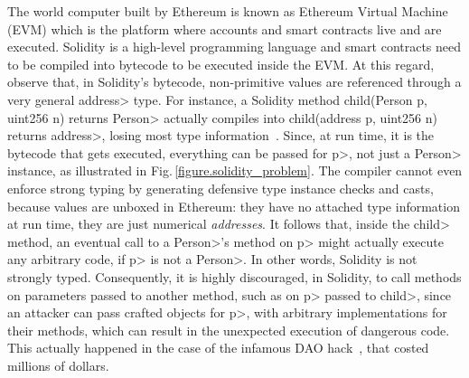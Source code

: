 The world computer built by Ethereum is known as Ethereum Virtual Machine (EVM) which is the platform where accounts and smart contracts live and are executed.
Solidity is a high-level programming language and smart contracts need to be compiled into bytecode to be executed inside the EVM. At this regard, observe that, in Solidity's bytecode, non-primitive values are referenced through a very general \<address> type. For instance, a Solidity method \<child(Person p, uint256 n) returns Person> actually compiles into \<child(address p, uint256 n) returns address>, losing most type information~\cite{CrafaPZ19}. Since, at run time, it is the bytecode that gets executed, everything can be passed for \<p>, not just a \<Person> instance, as illustrated in Fig.\,\ref{figure.solidity_problem}.
The compiler cannot even enforce strong typing by generating defensive type instance checks and casts, because values are unboxed in Ethereum: they have no attached type information at run time, they are just numerical \emph{addresses}. It follows that, inside the \<child> method, an eventual call to a \<Person>'s method on \<p> might actually execute any arbitrary code, if \<p> is not a \<Person>. In other words, Solidity is not strongly typed. Consequently, it is highly discouraged, in Solidity, to call methods on parameters passed to another method, such as on \<p> passed to \<child>, since an attacker can pass crafted objects for \<p>, with arbitrary implementations for their methods, which can result in the unexpected execution of dangerous code. This actually happened in the case of the infamous DAO hack~\cite{dao16}, that costed millions of dollars.


